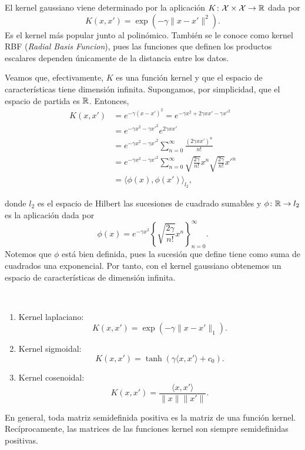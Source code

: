 \documentclass{book}
\begin{document}
\begin{ex}
	El kernel gaussiano viene determinado por la aplicación $K\colon \mathcal{X} \times \mathcal{X} \to \mathbb{R}$ dada por
	\[ K(x,x') = \exp(-\gamma\|x-x'\|^2).\]
	Es el kernel más popular junto al polinómico. También se le conoce como kernel RBF (\emph{Radial Basis Funcion}), pues las funciones que definen los productos escalares dependen únicamente de la distancia entre los datos.

	Veamos que, efectivamente, $K$ es una función kernel y que el espacio de características tiene dimensión infinita. Supongamos, por simplicidad, que el espacio de partida es $\mathbb{R}$. Entonces,
	\begin{align*}
		K(x,x') &= e^{-\gamma(x-x')^2} = e^{-\gamma x^2 + 2\gamma xx' -\gamma x'^2 } \\
		        &= e^{-\gamma x^2 -\gamma x'^2 }e^{2\gamma xx'} \\
		        &= e^{-\gamma x^2 -\gamma x'^2 }\sum_{n=0}^{\infty} \frac{(2\gamma xx')^n}{n!} \\
		        &= e^{-\gamma x^2 -\gamma x'^2 }\sum_{n=0}^{\infty} \sqrt{\frac{2\gamma}{n!}}x^n\sqrt{\frac{2\gamma}{n!}}x'^n \\
		        &= \langle \phi(x), \phi(x') \rangle_{l_2}, 
	\end{align*}

	donde $l_2$ es el espacio de Hilbert las sucesiones de cuadrado sumables y $\phi \colon \mathbb{R} \to l_2$ es la aplicación dada por
	\[\phi(x) = e^{-\gamma x^2}\left\{ \sqrt{\frac{2\gamma}{n!}}x^n \right\}_{n=0}^{\infty}.\]
	Notemos que $\phi$ está bien definida, pues la sucesión que define tiene como suma de cuadrados una exponencial. Por tanto, con el kernel gaussiano obtenemos un espacio de características de dimensión infinita.
\end{ex}

\begin{ex}
	$ $ \newline
	\begin{enumerate}
		\item Kernel laplaciano: \[ K(x,x') = \exp(-\gamma\|x-x'\|_1). \]
		\item Kernel sigmoidal: \[ K(x,x') = \tanh(\gamma \langle x,x' \rangle + c_0). \]
		\item Kernel cosenoidal: \[ K(x,x') = \frac{\langle x,x' \rangle}{ \|x\|\|x'\|}. \]
	\end{enumerate}
	En general, toda matriz semidefinida positiva es la matriz de una función kernel. Recíprocamente, las matrices de las funciones kernel son siempre semidefinidas positivas.
\end{ex}
\end{document}
